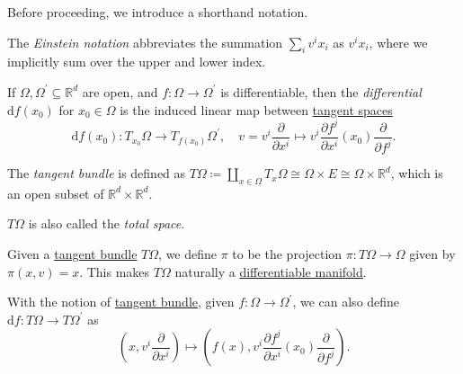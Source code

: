 Before proceeding, we introduce a shorthand notation.

\begin{notation}
	The \emph{Einstein notation} abbreviates the summation \(\sum_{i} v^i x_i\) as \(v^i x_i\), where we implicitly sum over the upper and lower index.
\end{notation}

\begin{definition}\label{def:differential-of-Euclidean-space}
	If \(\Omega , \Omega ^{\prime} \subseteq \mathbb{R} ^d\) are open, and \(f\colon \Omega \to \Omega ^\prime \) is differentiable, then the \emph{differential} \(\mathrm{d} f(x_0)\) for \(x_0 \in \Omega \) is the induced linear map between \hyperref[def:tangent-space-of-Euclidean-space]{tangent spaces}
	\[
		\mathrm{d} f(x_0) \colon T_{x_0}\Omega \to T_{f(x_0)}\Omega ^\prime,\quad
		v = v^i \frac{\partial }{\partial x^i} \mapsto v^i \frac{\partial f^j}{\partial x^i} (x_0) \frac{\partial }{\partial f^j}.
	\]
\end{definition}

\begin{definition}\label{def:tangent-bundle-of-Euclidean-space}
	The \emph{tangent bundle} is defined as \(T \Omega \coloneqq \coprod_{x\in \Omega } T_x \Omega \cong \Omega \times E \cong \Omega \times \mathbb{R} ^d\), which is an open subset of \(\mathbb{R} ^d \times \mathbb{R} ^d\).
\end{definition}

\begin{note}
	\(T \Omega \) is also called the \emph{total space}.
\end{note}

\begin{remark}
	Given a \hyperref[def:tangent-bundle-of-Euclidean-space]{tangent bundle} \(T \Omega \), we define \(\pi \) to be the projection \(\pi \colon T \Omega \to \Omega\) given by \(\pi (x, v) = x\). This makes \(T \Omega \) naturally a \hyperref[def:smooth-manifold]{differentiable manifold}.
\end{remark}

With the notion of \hyperref[def:tangent-bundle-of-Euclidean-space]{tangent bundle}, given \(f\colon \Omega \to \Omega ^\prime \), we can also define \(\mathrm{d} f\colon T \Omega \to T \Omega ^\prime \) as
\[
	\left( x, v^i \frac{\partial }{\partial x^i} \right) \mapsto \left( f(x), v^i \frac{\partial f^j}{\partial x^i} (x_0) \frac{\partial }{\partial f^j} \right).
\]

